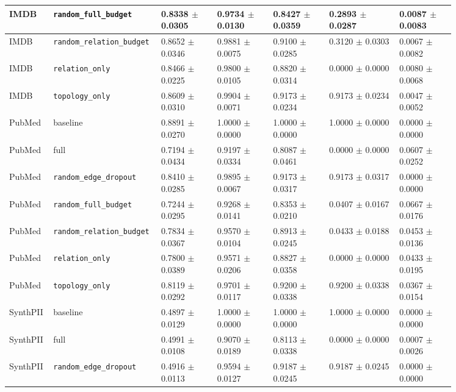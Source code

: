 \documentclass[preprint,12pt]{elsarticle}
\begin{document}
\begin{landscape}
\begin{longtable}{|L{0.07\linewidth}|L{0.15\linewidth}|C{0.12\linewidth}|C{0.12\linewidth}|C{0.12\linewidth}|C{0.15\linewidth}|C{0.12\linewidth}|}
IMDB & \nolinkurl{random_full_budget} & 0.8338 $\pm$ 0.0305 & 0.9734 $\pm$ 0.0130 & 0.8427 $\pm$ 0.0359 & 0.2893 $\pm$ 0.0287 & 0.0087 $\pm$ 0.0083 \\ \hline
IMDB & \nolinkurl{random_relation_budget} & 0.8652 $\pm$ 0.0346 & 0.9881 $\pm$ 0.0075 & 0.9100 $\pm$ 0.0285 & 0.3120 $\pm$ 0.0303 & 0.0067 $\pm$ 0.0082 \\ \hline
IMDB & \nolinkurl{relation_only} & 0.8466 $\pm$ 0.0225 & 0.9800 $\pm$ 0.0105 & 0.8820 $\pm$ 0.0314 & 0.0000 $\pm$ 0.0000 & 0.0080 $\pm$ 0.0068 \\ \hline
IMDB & \nolinkurl{topology_only} & 0.8609 $\pm$ 0.0310 & 0.9904 $\pm$ 0.0071 & 0.9173 $\pm$ 0.0234 & 0.9173 $\pm$ 0.0234 & 0.0047 $\pm$ 0.0052 \\ \hline
PubMed & baseline & 0.8891 $\pm$ 0.0270 & 1.0000 $\pm$ 0.0000 & 1.0000 $\pm$ 0.0000 & 1.0000 $\pm$ 0.0000 & 0.0000 $\pm$ 0.0000 \\ \hline
PubMed & full & 0.7194 $\pm$ 0.0434 & 0.9197 $\pm$ 0.0334 & 0.8087 $\pm$ 0.0461 & 0.0000 $\pm$ 0.0000 & 0.0607 $\pm$ 0.0252 \\ \hline
PubMed & \nolinkurl{random_edge_dropout} & 0.8410 $\pm$ 0.0285 & 0.9895 $\pm$ 0.0067 & 0.9173 $\pm$ 0.0317 & 0.9173 $\pm$ 0.0317 & 0.0000 $\pm$ 0.0000 \\ \hline
PubMed & \nolinkurl{random_full_budget} & 0.7244 $\pm$ 0.0295 & 0.9268 $\pm$ 0.0141 & 0.8353 $\pm$ 0.0210 & 0.0407 $\pm$ 0.0167 & 0.0667 $\pm$ 0.0176 \\ \hline
PubMed & \nolinkurl{random_relation_budget} & 0.7834 $\pm$ 0.0367 & 0.9570 $\pm$ 0.0104 & 0.8913 $\pm$ 0.0245 & 0.0433 $\pm$ 0.0188 & 0.0453 $\pm$ 0.0136 \\ \hline
PubMed & \nolinkurl{relation_only} & 0.7800 $\pm$ 0.0389 & 0.9571 $\pm$ 0.0206 & 0.8827 $\pm$ 0.0358 & 0.0000 $\pm$ 0.0000 & 0.0433 $\pm$ 0.0195 \\ \hline
PubMed & \nolinkurl{topology_only} & 0.8119 $\pm$ 0.0292 & 0.9701 $\pm$ 0.0117 & 0.9200 $\pm$ 0.0338 & 0.9200 $\pm$ 0.0338 & 0.0367 $\pm$ 0.0154 \\ \hline
SynthPII & baseline & 0.4897 $\pm$ 0.0129 & 1.0000 $\pm$ 0.0000 & 1.0000 $\pm$ 0.0000 & 1.0000 $\pm$ 0.0000 & 0.0000 $\pm$ 0.0000 \\ \hline
SynthPII & full & 0.4991 $\pm$ 0.0108 & 0.9070 $\pm$ 0.0189 & 0.8113 $\pm$ 0.0338 & 0.0000 $\pm$ 0.0000 & 0.0007 $\pm$ 0.0026 \\ \hline
SynthPII & \nolinkurl{random_edge_dropout} & 0.4916 $\pm$ 0.0113 & 0.9594 $\pm$ 0.0127 & 0.9187 $\pm$ 0.0245 & 0.9187 $\pm$ 0.0245 & 0.0000 $\pm$ 0.0000 \\ \hline

\end{longtable}
\end{landscape}
\end{document}
